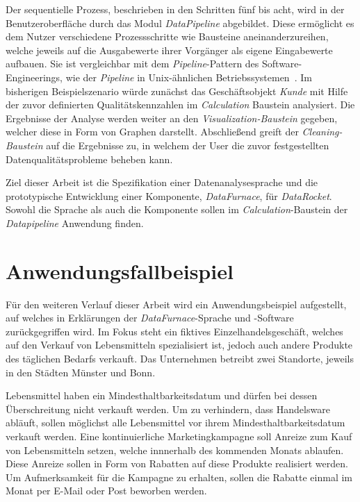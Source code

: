 \documentclass[
  language=german, %
  type=bachelor,%
  ngerman
]{isthesis}
\begin{document}
\begin{content}
	Der sequentielle Prozess, beschrieben in den Schritten fünf bis acht, wird in der
	Benutzeroberfläche durch das Modul \textit{DataPipeline}
	abgebildet. Diese ermöglicht es dem
	Nutzer verschiedene Prozessschritte wie Bausteine aneinanderzureihen,
	welche jeweils auf die Ausgabewerte ihrer Vorgänger als eigene Eingabewerte
	aufbauen. Sie ist vergleichbar mit dem \textit{Pipeline}-Pattern des
	Software-Engineerings, wie \zB{} der \textit{Pipeline} in Unix-ähnlichen
	Betriebssystemen~\cite[][]{spinellis2001notable}. Im bisherigen
	Beispielszenario würde zunächst das Geschäftsobjekt \textit{Kunde} mit Hilfe
	der zuvor definierten Qualitätskennzahlen im \textit{Calculation} Baustein
	analysiert. Die Ergebnisse der Analyse werden weiter an den
	\textit{Visualization-Baustein} gegeben, welcher diese in Form von Graphen
	darstellt. Abschließend greift der \textit{Cleaning-Baustein} auf die
	Ergebnisse zu, in welchem der User die zuvor festgestellten
	Datenqualitätsprobleme beheben kann.

	Ziel dieser Arbeit ist die Spezifikation einer Datenanalysesprache und die
	prototypische Entwicklung einer Komponente, \textit{DataFurnace}, für
	\textit{DataRocket}. Sowohl die Sprache als auch die Komponente sollen im
	\textit{Calculation}-Baustein der \textit{Datapipeline} Anwendung finden.

  \section{Anwendungsfallbeispiel}\label{sec:anwendungsfallbeispiel}

  Für den weiteren Verlauf dieser Arbeit wird ein Anwendungsbeispiel
  aufgestellt, auf welches in Erklärungen der \textit{DataFurnace}-Sprache und
  -Software zurückgegriffen wird. Im Fokus steht ein fiktives
  Einzelhandelsgeschäft, welches auf den Verkauf von Lebensmitteln
  spezialisiert ist, jedoch auch andere Produkte des täglichen Bedarfs
  verkauft. Das Unternehmen betreibt zwei Standorte, jeweils in den Städten
  Münster und Bonn.

  Lebensmittel haben ein Mindesthaltbarkeitsdatum und dürfen bei dessen
  Überschreitung nicht verkauft werden. Um zu verhindern, dass Handelsware
  abläuft, sollen möglichst alle Lebensmittel vor ihrem
  Mindesthaltbarkeitsdatum verkauft werden. Eine kontinuierliche
  Marketingkampagne soll Anreize zum Kauf von Lebensmitteln setzen, welche
  innnerhalb des kommenden Monats ablaufen. Diese Anreize sollen in Form von
  Rabatten auf diese Produkte realisiert werden. Um Aufmerksamkeit für die
  Kampagne zu erhalten, sollen die Rabatte einmal im Monat per E-Mail oder Post
  beworben werden. 


\end{content}
\end{document}
